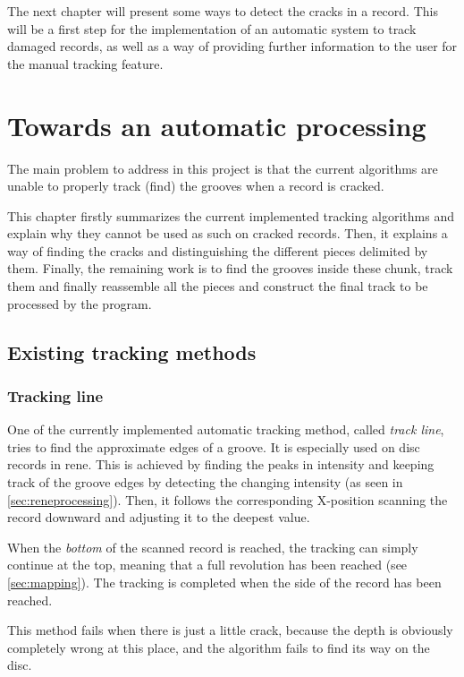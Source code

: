The next chapter will present some ways to detect the cracks in a record. This will be a first step for the implementation of an automatic system to track damaged records, as well as a way of providing further information to the user for the manual tracking feature.

\chapter{Towards an automatic processing}
\label{chap:autoprocess}

The main problem to address in this project is that the current algorithms are unable to properly track (find) the grooves when a record is cracked.

This chapter firstly summarizes the current implemented tracking algorithms and explain why they cannot be used as such on cracked records. Then, it explains a way of finding the cracks and distinguishing the different pieces delimited by them. Finally, the remaining work is to find the grooves inside these chunk, track them and finally reassemble all the pieces and construct the final track to be processed by the program.

\section{Existing tracking methods}
\label{sec:trackmethods}

\subsection{Tracking line}

One of the currently implemented automatic tracking method, called \emph{track line}, tries to find the approximate edges of a groove. It is especially used on disc records in \gls{rene}. This is achieved by finding the peaks in intensity and keeping track of the groove edges by detecting the changing intensity (as seen in \autoref{sec:reneprocessing}). Then, it follows the corresponding X-position scanning the record downward and adjusting it to the deepest value.

When the \emph{bottom} of the scanned record is reached, the tracking can simply continue at the top, meaning that a full revolution has been reached (see \autoref{sec:mapping}). The tracking is completed when the side of the record has been reached.

This method fails when there is just a little crack, because the depth is obviously completely wrong at this place, and the algorithm fails to find its way on the disc.

